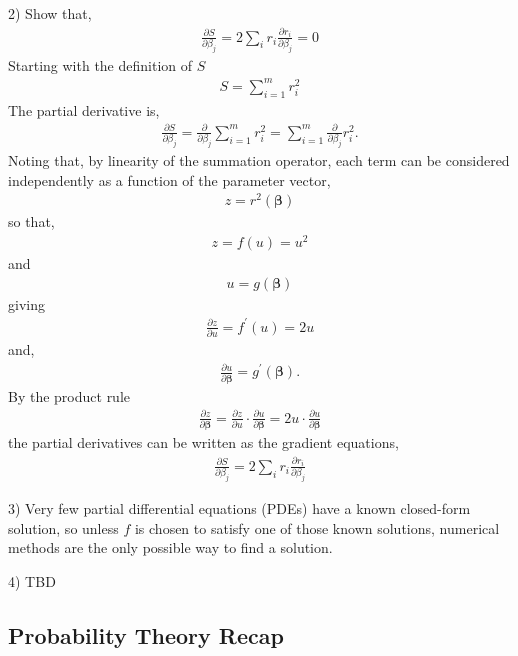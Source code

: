 \documentclass[11pt,a4paper]{article}
\begin{document}
2) Show that,
\begin{align}
\frac{\partial S}{\partial\beta_{j}} = 2\sum_{i}^{}r_{i}\frac{\partial r_{i}}{\partial\beta_{j}} = 0
\end{align}
Starting with the definition of \(S\)
\begin{align}
S = \sum_{i = 1}^{m}r_{i}^{2}
\end{align}
The partial derivative is,
\begin{align}
\frac{\partial S}{\partial\beta_{j}} = \frac{\partial}{\partial\beta_{j}}\sum_{i = 1}^{m}r_{i}^{2} = \sum_{i = 1}^{m}{\frac{\partial}{\partial\beta_{j}}r_{i}^{2}}.
\end{align}
Noting that, by linearity of the summation operator, each term can be
considered independently as a function of the parameter vector,
\begin{align}
z = r^{2}(\boldsymbol{\beta})
\end{align}
so that,
\begin{align}
z = f(u) = u^{2}
\end{align}
and
\begin{align}
u = g(\boldsymbol{\beta})
\end{align}
giving
\begin{align}
\frac{\partial z}{\partial u} = f^{\prime}(u) = 2u
\end{align}
and,
\begin{align}
\frac{\partial u}{\partial\boldsymbol{\beta}} = g^{\prime}\left( \boldsymbol{\beta} \right).
\end{align}
By the product rule
\begin{align}
\frac{\partial z}{\partial\boldsymbol{\beta}} = \frac{\partial z}{\partial u} \cdot \frac{\partial u}{\partial\boldsymbol{\beta}} = 2u \cdot \frac{\partial u}{\partial\boldsymbol{\beta}}
\end{align}
the partial derivatives can be written as the gradient equations,
\begin{align}
\frac{\partial S}{\partial\beta_{j}} = 2\sum_{i}^{}r_{i}\frac{\partial r_{i}}{\partial\beta_{j}}
\end{align}

3) Very few partial differential equations (PDEs) have a known
closed-form solution, so unless \(f\) is chosen to satisfy one of those
known solutions, numerical methods are the only possible way to find a
solution.

4) TBD

\subsection{Probability Theory Recap}
\end{document}
